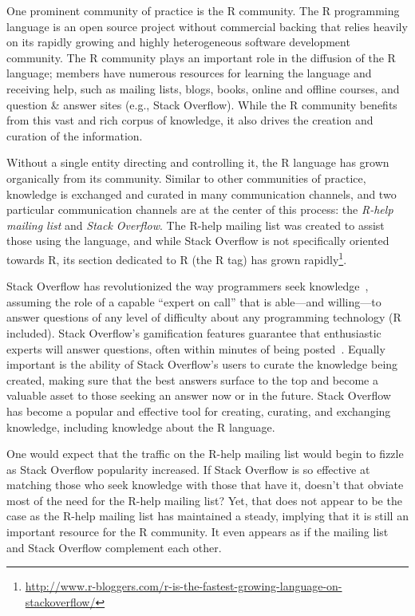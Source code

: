 \documentclass[smallextended]{svjour3}       %
\newcommand{\channels}{communication channels\xspace}
\newcommand{\SO}{Stack Overflow\xspace}
\newcommand{\RH}{R-help\xspace}
\begin{document}
One prominent community of practice is the R community. The R
programming language is an open source project without commercial
backing that relies heavily on its rapidly growing and highly
heterogeneous software development community. The R community plays an
important role in the diffusion of the R language; members have
numerous resources for learning the language and receiving help, such
as mailing lists, blogs, books, online and offline courses, and
question \& answer sites (e.g., \SO). While the R community benefits
from this vast and rich corpus of knowledge, it also drives the
creation and curation of the information.

Without a single entity directing and controlling it, the R language has grown organically from its community. Similar to other communities of practice, knowledge is exchanged and curated in many \channels, and two particular \channels are at the center of this process: the \textit{\RH mailing list} and \textit{\SO}. The \RH mailing list was created to assist those using the language, and while \SO is not specifically oriented towards R, its section dedicated to R (the R tag) has grown rapidly\footnote{\href{http://www.r-bloggers.com/r-is-the-fastest-growing-language-on-stackoverflow/}{http://www.r-bloggers.com/r-is-the-fastest-growing-language-on-stackoverflow/}}.

\SO has revolutionized the way programmers seek knowledge~\cite{li2013help,Vasilescu2014c}, assuming the role of a capable ``expert on call'' that is able---and willing---to answer questions of any level of difficulty about any programming technology (R included). \SO's gamification features guarantee that enthusiastic experts will answer questions, often within minutes of being posted~\cite{Mamykina2011}. Equally important is the ability of \SO's users to curate the knowledge being created, making sure that the best answers surface to the top and become a valuable asset to those seeking an answer now or in the future. \SO has become a popular and effective tool for creating, curating, and exchanging knowledge, including knowledge about the R language.

One would expect that the traffic on the \RH mailing list would begin
to fizzle as \SO popularity increased. If \SO is so effective at
matching those who seek knowledge with those that have it, doesn't
that obviate most of the need for the \RH mailing list? Yet, that does
not appear to be the case as the \RH mailing list has maintained a
steady, implying that it is still an important resource for the R
community. It even appears as if the mailing list and \SO complement
each other.
\end{document}
